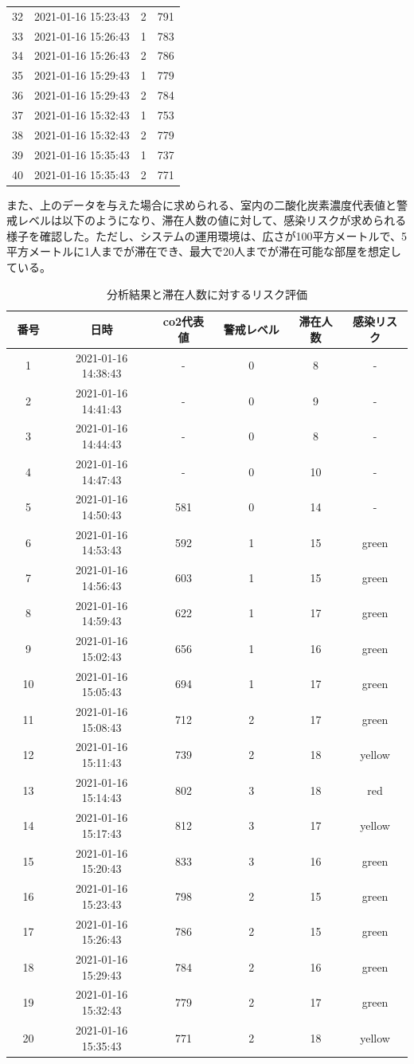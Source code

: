 \begin{longtable}{|c|c|c|c|}
	32 & 2021-01-16 15:23:43 & 2 & 791\\
	33 & 2021-01-16 15:26:43 & 1 & 783\\ 
	34 & 2021-01-16 15:26:43 & 2 & 786\\ 
	35 & 2021-01-16 15:29:43 & 1 & 779\\
	36 & 2021-01-16 15:29:43 & 2 & 784\\ 
	37 & 2021-01-16 15:32:43 & 1 & 753\\
	38 & 2021-01-16 15:32:43 & 2 & 779\\
	39 & 2021-01-16 15:35:43 & 1 & 737\\ 
	40 & 2021-01-16 15:35:43 & 2 & 771\\ \hline
\end{longtable}

また、上のデータを与えた場合に求められる、室内の二酸化炭素濃度代表値と警戒レベルは以下のようになり、滞在人数の値に対して、感染リスクが求められる様子を確認した。ただし、システムの運用環境は、広さが100平方メートルで、5平方メートルに1人までが滞在でき、最大で20人までが滞在可能な部屋を想定している。

\begin{longtable}{|c|c|c|c|c|c|}
\caption{分析結果と滞在人数に対するリスク評価}
\label{testresult}
\endhead
\hline
番号　& 日時　& co2代表値 & 警戒レベル　& 滞在人数 & 感染リスク\\ \hline \hline
1 & 2021-01-16 14:38:43 & - & 0 & 8 & -\\
2 & 2021-01-16 14:41:43 & - & 0 & 9 & -\\
3 & 2021-01-16 14:44:43 & - & 0 & 8 & -\\
4 & 2021-01-16 14:47:43 & - & 0 & 10 & -\\ 
5 & 2021-01-16 14:50:43 & 581 & 0 & 14 & -\\ 
6 & 2021-01-16 14:53:43 & 592 & 1 & 15 & green\\ 
7 & 2021-01-16 14:56:43 & 603 & 1 & 15 & green\\
8 & 2021-01-16 14:59:43 & 622 & 1 & 17 & green\\
9 & 2021-01-16 15:02:43 & 656 & 1 & 16 & green\\
10 & 2021-01-16 15:05:43 & 694 & 1 & 17 & green\\
11 & 2021-01-16 15:08:43 & 712 & 2 & 17 & green\\
12 & 2021-01-16 15:11:43 & 739 & 2 & 18 & yellow\\
13 & 2021-01-16 15:14:43 & 802 & 3 & 18 & red\\
14 & 2021-01-16 15:17:43 & 812 & 3 & 17 & yellow\\
15 & 2021-01-16 15:20:43 & 833 & 3 & 16 & green\\
16 & 2021-01-16 15:23:43 & 798 & 2 & 15 & green\\
17 & 2021-01-16 15:26:43 & 786 & 2 & 15 & green\\ 
18 & 2021-01-16 15:29:43 & 784 & 2 & 16 & green\\
19 & 2021-01-16 15:32:43 & 779 & 2 & 17 & green\\
20 & 2021-01-16 15:35:43 & 771 & 2 & 18 & yellow\\ \hline
\end{longtable}


